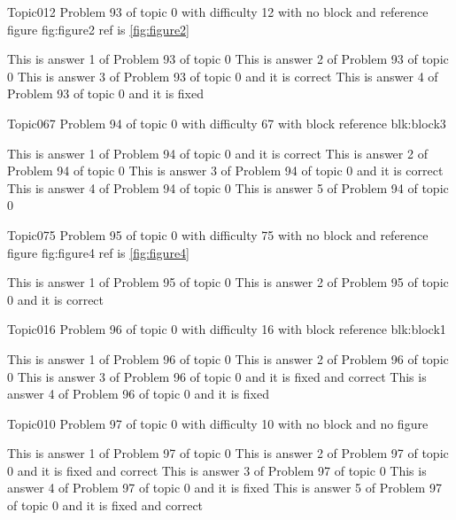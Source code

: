 \documentclass[master]{exam}
\begin{document}
\begin{problem}{Topic0}{12}
	Problem 93 of topic 0 with difficulty 12 with no block and reference figure fig:figure2 ref is \ref{fig:figure2}
	\begin{answers}
		\answer This is answer 1 of Problem 93 of topic 0 
		\answer This is answer 2 of Problem 93 of topic 0 
		\answer[correct] This is answer 3 of Problem 93 of topic 0 and it is correct
		\answer[fixed] This is answer 4 of Problem 93 of topic 0 and it is fixed
	\end{answers}
\end{problem}

\begin{problem}[requires=blk:block3]{Topic0}{67}
	Problem 94 of topic 0 with difficulty 67 with block reference blk:block3
	\begin{answers}
		\answer[correct] This is answer 1 of Problem 94 of topic 0 and it is correct
		\answer This is answer 2 of Problem 94 of topic 0 
		\answer[correct] This is answer 3 of Problem 94 of topic 0 and it is correct
		\answer This is answer 4 of Problem 94 of topic 0 
		\answer This is answer 5 of Problem 94 of topic 0 
	\end{answers}
\end{problem}

\begin{problem}{Topic0}{75}
	Problem 95 of topic 0 with difficulty 75 with no block and reference figure fig:figure4 ref is \ref{fig:figure4}
	\begin{answers}
		\answer This is answer 1 of Problem 95 of topic 0 
		\answer[correct] This is answer 2 of Problem 95 of topic 0 and it is correct
	\end{answers}
\end{problem}

\begin{problem}[requires=blk:block1]{Topic0}{16}
	Problem 96 of topic 0 with difficulty 16 with block reference blk:block1
	\begin{answers}
		\answer This is answer 1 of Problem 96 of topic 0 
		\answer This is answer 2 of Problem 96 of topic 0 
		 This is answer 3 of Problem 96 of topic 0 and it is fixed and correct
		\answer[fixed] This is answer 4 of Problem 96 of topic 0 and it is fixed
	\end{answers}
\end{problem}

\begin{problem}{Topic0}{10}
	Problem 97 of topic 0 with difficulty 10 with no block and no figure
	\begin{answers}
		\answer This is answer 1 of Problem 97 of topic 0 
		 This is answer 2 of Problem 97 of topic 0 and it is fixed and correct
		\answer This is answer 3 of Problem 97 of topic 0 
		\answer[fixed] This is answer 4 of Problem 97 of topic 0 and it is fixed
		 This is answer 5 of Problem 97 of topic 0 and it is fixed and correct
	\end{answers}
\end{problem}
\end{document}
